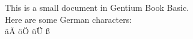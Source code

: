 \documentclass{article}
\begin{document}
This is a small document in Gentium Book Basic.
\\
Here are some German characters:
\\
äÄ öÖ üÜ ß
\end{document}
